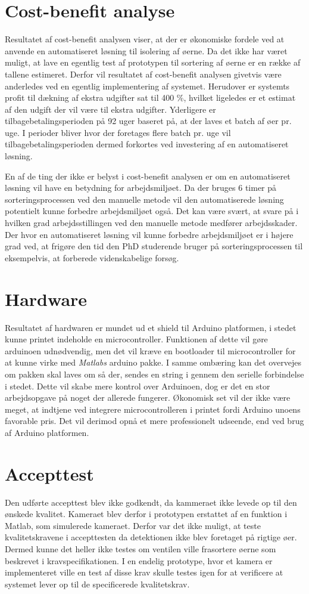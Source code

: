 \section{Cost-benefit analyse}
Resultatet af cost-benefit analysen viser, at der er økonomiske fordele ved at anvende en automatiseret løsning til isolering af øerne. Da det ikke har været muligt, at lave en egentlig test af prototypen til sortering af øerne er en række af tallene estimeret. Derfor vil resultatet af cost-benefit analysen givetvis være anderledes ved en egentlig implementering af systemet. Herudover er systemts profit til dækning af ekstra udgifter sat til 400 \%, hvilket ligeledes er et estimat af den udgift der vil være til ekstra udgifter. Yderligere er tilbagebetalingsperioden på 92 uger baseret på, at der laves et batch af øer pr. uge. I perioder bliver hvor der foretages flere batch pr. uge vil tilbagebetalingsperioden dermed forkortes ved investering af en automatiseret løsning.

En af de ting der ikke er belyst i cost-benefit analysen er om en automatiseret løsning vil have en betydning for arbejdsmiljøet. Da der bruges 6 timer på sorteringsprocessen ved den manuelle metode vil den automatiserede løsning potentielt kunne forbedre arbejdsmiljøet også. Det kan være svært, at svare på i hvilken grad arbejdsstillingen ved den manuelle metode medfører arbejdsskader. Der hvor en automatiseret løsning vil kunne forbedre arbejdsmiljøet er i højere grad ved, at frigøre den tid den PhD studerende bruger på sorteringsprocessen til eksempelvis, at forberede videnskabelige forsøg.

\section{Hardware}
Resultatet af hardwaren er mundet ud et shield til Arduino platformen, i stedet kunne printet indeholde en microcontroller. Funktionen af dette vil gøre arduinoen udnødvendig, men det vil kræve en bootloader til microcontroller for at kunne virke med \textit{Matlabs} arduino pakke. I samme ombæring kan det overvejes om pakken skal laves om så der, sendes en string i gennem den serielle forbindelse i stedet. Dette vil skabe mere kontrol over Arduinoen, dog er det en stor arbejdsopgave på noget der allerede fungerer. Økonomisk set vil der ikke være meget, at indtjene ved integrere microcontrolleren i printet fordi Arduino unoens favorable pris. Det vil derimod opnå et mere professionelt udseende, end ved brug af Arduino platformen.

\section{Accepttest}
Den udførte accepttest blev ikke godkendt, da kammeraet ikke levede op til den ønskede kvalitet. Kameraet blev derfor i prototypen erstattet af en funktion i Matlab, som simulerede kameraet. Derfor var det ikke muligt, at teste kvalitetskravene i accepttesten da detektionen ikke blev foretaget på rigtige øer. Dermed kunne det heller ikke testes om ventilen ville frasortere øerne som beskrevet i kravspecifikationen. I en endelig prototype, hvor et kamera er implementeret ville en test af disse krav skulle testes igen for at verificere at systemet lever op til de specificerede kvalitetskrav. 